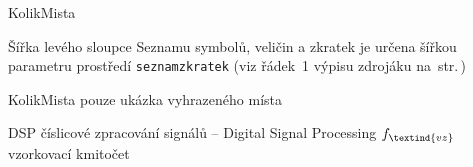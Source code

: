 \begin{seznamzkratek}{KolikMista}

		{Šířka levého sloupce Seznamu symbolů, veličin a zkratek}								%
		{je určena šířkou parametru prostředí \texttt{seznamzkratek} (viz řádek~1 výpisu zdrojáku na~str.\,\pageref{lst:zkratky})}

		{KolikMista}
		{pouze ukázka vyhrazeného místa}

		{DSP}								%
		{číslicové zpracování signálů -- Digital Signal Processing}
		{\ensuremath{f_\textind{vz}}} %
		{vzorkovací kmitočet}					%

\end{seznamzkratek}

